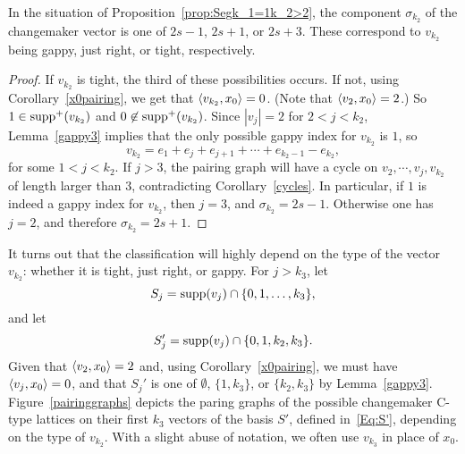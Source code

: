 \begin{cor}\label{cor:sigmak2}
In the situation of Proposition~\ref{prop:Segk_1=1k_2>2}, the component $\sigma_{k_2}$ of the changemaker vector is one of $2s-1$, $2s+1$, or $2s+3$. These correspond to $v_{k_2}$ being gappy, just right, or tight, respectively.
\end{cor}
\begin{proof}
If $v_{k_2}$ is tight, the third of these possibilities occurs. If not, using Corollary~\ref{x0pairing}, we get that $\left\langle v_{k_2} , x_0 \right\rangle = 0$. (Note that $\left\langle v_2 , x_0 \right\rangle = 2$.) So $1 \in \operatorname{supp}^+(v_{k_2})$ and $0 \not \in \operatorname{supp}^+(v_{k_2})$. Since $|v_j| = 2$ for $2 < j < k_2$, Lemma~\ref{gappy3} implies that the only possible gappy index for $v_{k_2}$ is $1$, so
\begin{equation*}
v_{k_2} = e_1 + e_j + e_{j+1} + \cdots + e_{k_2 - 1} - e_{k_2},
\end{equation*}
for some $1 < j < k_2$. If $j > 3$, the pairing graph will have a cycle on $v_2, \cdots, v_j, v_{k_2}$ of length larger than $3$, contradicting Corollary~\ref{cycles}. In particular, if $1$ is indeed a gappy index for $v_{k_2}$, then $j = 3$, and $\sigma_{k_2} = 2s -1$. Otherwise one has $j = 2$, and therefore $\sigma_{k_2} = 2s+1$. 
\end{proof}

It turns out that the classification will highly depend on the type of the vector $v_{k_2}$: whether it is tight, just right, or gappy. For $j > k_3$, let 
\begin{equation}\label{Eq:Sj}
S_j = \operatorname{supp}(v_j) \cap \{0,1,\dots,k_3\},
\end{equation} 
and let 
\begin{equation}\label{Eq:S'j}
S_j' = \operatorname{supp}(v_j) \cap \{0,1,k_2,k_3\}.
\end{equation} 
Given that $\left\langle v_2 , x_0 \right\rangle = 2$ and, using Corollary~\ref{x0pairing}, we must have $\left\langle v_j , x_0 \right\rangle = 0$, and that $S_j'$ is one of $\emptyset$, $\{1,k_3\}$, or $\{k_2,k_3\}$ by Lemma~\ref{gappy3}. Figure~\ref{pairinggraphs} depicts the paring graphs of the possible changemaker C-type lattices on their first $k_3$ vectors of the basis $S'$, defined in~\eqref{Eq:S'}, depending on the type of $v_{k_2}$. With a slight abuse of notation, we often use $v_{k_3}$ in place of $x_0$.

